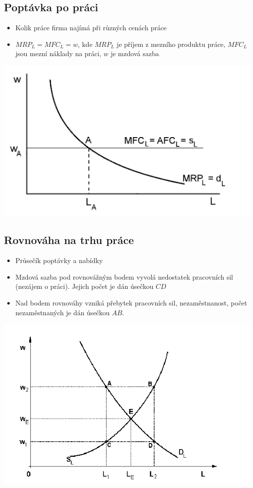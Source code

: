 \subsection{Poptávka po práci}
\begin{itemize}
    \item Kolik práce firma najímá při různých cenách práce
    \item $MRP_L=MFC_L=w$, kde $MRP_L$ je příjem z mezního produktu práce, $MFC_L$ jsou
    mezní náklady na práci, $w$ je mzdová sazba 
\end{itemize}
\includegraphics[width=16cm]{images/17_poptavka_po_praci.png}

\subsection{Rovnováha na trhu práce}
\begin{itemize}
    \item Průsečík poptávky a nabídky
    \item Mzdová sazba pod rovnovážným bodem vyvolá nedostatek pracovních sil (nezájem o práci).
    Jejich počet je dán úsečkou $CD$
    \item Nad bodem rovnováhy vzniká přebytek pracovních sil, nezaměstnanost, počet nezaměstnaných 
    je dán úsečkou $AB$.
\end{itemize}
\includegraphics[width=16cm]{images/17_rovnovaha.png}

